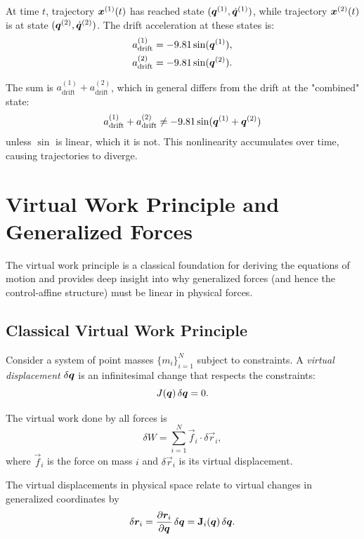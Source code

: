 At time $t$, trajectory $\bm{x}^{(1)}(t)$ has reached state $(\bm{q}^{(1)}, \dot{\bm{q}}^{(1)})$, while
trajectory $\bm{x}^{(2)}(t)$ is at state $(\bm{q}^{(2)}, \dot{\bm{q}}^{(2)})$. The drift acceleration at
these states is:
\begin{align}
a_{\text{drift}}^{(1)} &= -9.81\sin(\bm{q}^{(1)}), \\
a_{\text{drift}}^{(2)} &= -9.81\sin(\bm{q}^{(2)}).
\end{align}

The sum is $a_{\text{drift}}^{(1)} + a_{\text{drift}}^{(2)}$, which in general differs from
the drift at the "combined" state:
\begin{equation}
a_{\text{drift}}^{(1)} + a_{\text{drift}}^{(2)} \neq -9.81\sin(\bm{q}^{(1)} + \bm{q}^{(2)})
\end{equation}
unless $\sin$ is linear, which it is not. This nonlinearity accumulates over time, causing
trajectories to diverge.


\section{Virtual Work Principle and Generalized Forces}

The virtual work principle is a classical foundation for deriving the equations of motion
and provides deep insight into why generalized forces (and hence the control-affine structure)
must be linear in physical forces.

\subsection{Classical Virtual Work Principle}

Consider a system of point masses $\{m_i\}_{i=1}^N$ subject to constraints. A \emph{virtual
displacement} $\delta\bm{q}$ is an infinitesimal change that respects the constraints:
\begin{equation}
J(\bm{q})\,\delta\bm{q} = 0.
\label{eq:ch3:virtual-constraint}
\end{equation}

The virtual work done by all forces is
\begin{equation}
\delta W = \sum_{i=1}^N \vec{f}_i \cdot \delta\vec{r}_i,
\label{eq:ch3:virtual-work-physical}
\end{equation}
where $\vec{f}_i$ is the force on mass $i$ and $\delta\vec{r}_i$ is its virtual displacement.

The virtual displacements in physical space relate to virtual changes in generalized coordinates by
\begin{equation}
\delta\bm{r}_i = \frac{\partial\bm{r}_i}{\partial\bm{q}}\,\delta\bm{q} = \mathbf{J}_{i}(\bm{q})\,\delta\bm{q}.
\label{eq:ch3:virtual-jacobian}
\end{equation}


